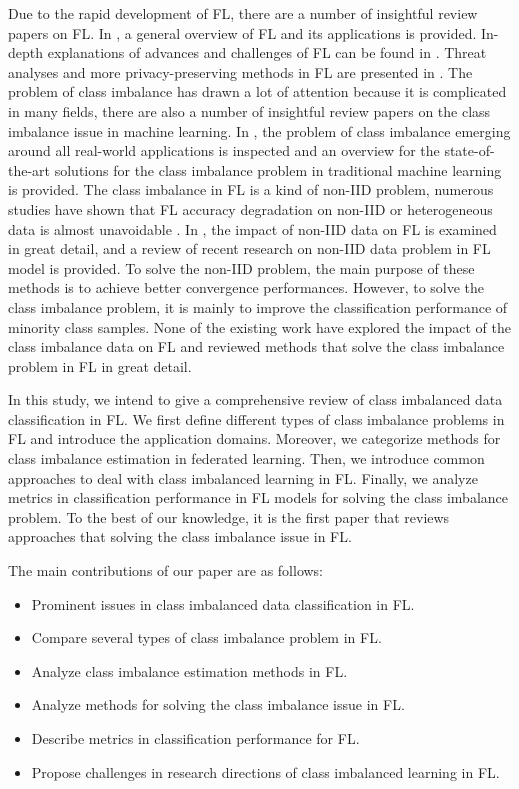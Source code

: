 \documentclass[10pt,journal,compsoc]{IEEEtran}
\begin{document}
	Due to the rapid development of FL, there are a number of insightful review papers on FL. In \cite{zhang2021survey} \cite{yang2019federated}, a general overview of FL and its applications is provided. In-depth explanations of advances and challenges of FL can be found in \cite{kairouz2021advances} \cite{khan2021federated}. Threat analyses and more privacy-preserving methods in FL are presented in \cite{yin2021comprehensive} \cite{mothukuri2021survey}. The problem of class imbalance has drawn a lot of attention because it is complicated in many fields, there are also a number of insightful review papers on the class imbalance issue in machine learning. In \cite{kaur2019systematic} \cite{haixiang2017learning} , the problem of class imbalance emerging around all real-world applications is inspected and an overview for the state-of-the-art solutions for the class imbalance problem in traditional machine learning is provided. The class imbalance in FL is a kind of non-IID problem, numerous studies have shown that FL accuracy degradation on non-IID or heterogeneous data is almost unavoidable \cite{zhao2018federated}. In \cite{zhu2021federated}, the impact of non-IID data on FL is examined in great detail, and a review of recent research on non-IID data problem in FL model is provided. To solve the non-IID problem, the main purpose of these methods is to achieve better convergence performances. However, to solve the class imbalance problem, it is mainly to improve the classification performance of minority class samples. None of the existing work have explored the impact of the class imbalance data on FL and reviewed methods that solve the class imbalance problem in FL in great detail.
	
	In this study, we intend to give a comprehensive review of class imbalanced data classification in FL. We first define different types of class imbalance problems in FL and introduce the application domains. Moreover, we categorize methods for class imbalance estimation in federated learning. Then, we introduce common approaches to deal with class imbalanced learning in FL. Finally, we analyze metrics in classification performance in FL models for solving the class imbalance problem. To the best of our knowledge, it is the first paper that reviews approaches that solving the class imbalance issue in FL.
	
	The main contributions of our paper are as follows:
	\begin{itemize}
		\item Prominent issues in class imbalanced data classification in FL.
		\item Compare several types of class imbalance problem in FL.
		\item Analyze class imbalance estimation methods in FL.
		\item Analyze methods for solving the class imbalance issue in FL.
		\item Describe metrics in classification performance for FL.
		\item Propose challenges in research directions of class imbalanced learning in FL.
	\end{itemize}
	
\end{document}
